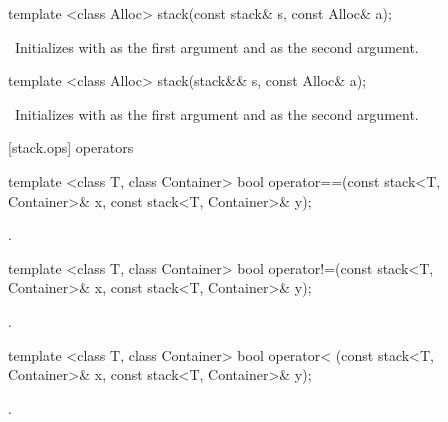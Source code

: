 %
\begin{itemdecl}
template <class Alloc> stack(const stack& s, const Alloc& a);
\end{itemdecl}

\begin{itemdescr}
\pnum
\effects\ Initializes  with  as the first argument and 
as the second argument.
\end{itemdescr}

%
\begin{itemdecl}
template <class Alloc> stack(stack&& s, const Alloc& a);
\end{itemdecl}

\begin{itemdescr}
\pnum
\effects\ Initializes  with  as the first argument and 
as the second argument.
\end{itemdescr}

[stack.ops]{ operators}

%
\begin{itemdecl}
template <class T, class Container>
  bool operator==(const stack<T, Container>& x, const stack<T, Container>& y);
\end{itemdecl}

\begin{itemdescr}
\pnum
\returns
{}.
\end{itemdescr}

%
\begin{itemdecl}
template <class T, class Container>
  bool operator!=(const stack<T, Container>& x, const stack<T, Container>& y);
\end{itemdecl}

\begin{itemdescr}
\pnum
\returns
{}.
\end{itemdescr}

%
\begin{itemdecl}
template <class T, class Container>
  bool operator< (const stack<T, Container>& x, const stack<T, Container>& y);
\end{itemdecl}

\begin{itemdescr}
\pnum
\returns
{}.
\end{itemdescr}

